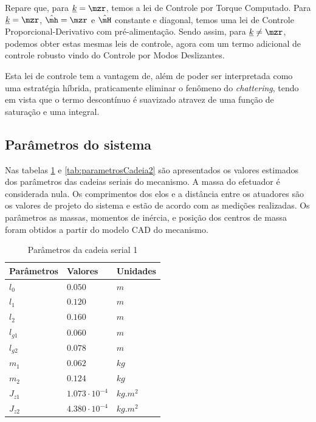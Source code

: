 \documentclass[]{politex}
\begin{document}
Repare que, para $\underline{k} = \mzr$, temos a lei de Controle por Torque Computado. Para $\underline{k} = \mzr$, $\hat{\mh} = \mzr$ e $\hat{\mH}$ constante e diagonal, temos uma lei de Controle Proporcional-Derivativo com pré-alimentação. Sendo assim, para $\underline{k} \neq \mzr$, podemos obter estas mesmas leis de controle, agora com um termo adicional de controle robusto vindo do Controle por Modos Deslizantes.

Esta lei de controle tem a vantagem de, além de poder ser interpretada como uma estratégia híbrida, praticamente eliminar o fenômeno do \emph{chattering}, tendo em vista que o termo descontínuo é suavizado atravez de uma função de saturação e uma integral.

\subsection{Parâmetros do sistema}

Nas tabelas \ref{tab:parametrosCadeia1} e \ref{tab:parametrosCadeia2} são apresentados os valores estimados dos parâmetros das cadeias seriais do mecanismo. A massa do efetuador é considerada nula. Os comprimentos dos elos e a distância entre os atuadores são os valores de projeto do sistema e estão de acordo com as medições realizadas. Os parâmetros as massas, momentos de inércia, e posição dos centros de massa foram obtidos a partir do modelo CAD do mecanismo. 

\begin{table}[H] 
\centering
\caption{Parâmetros da cadeia serial 1}
\label{tab:parametrosCadeia1}
\begin{tabular}{l|l|l}
Parâmetros   & Valores                  & Unidades      \\ \hline
$l_0$        & $0.050$                     & $m$        \\
$l_1$        & $0.120$                     & $m$        \\
$l_2$        & $0.160$                     & $m$        \\
$l_{g1}$     & $0.060$                     & $m$        \\
$l_{g2}$     & $0.078$                    & $m$        \\
$m_1$        & $0.062$                    & $kg$       \\
$m_2$        & $0.124$                    & $kg$       \\
$J_{z1}$     & $1.073 \cdot 10^{-4}$    & $kg.m^{2}$ \\
$J_{z2}$     & $4.380 \cdot 10^{-4}$    & $kg.m^{2}$ \\
\end{tabular}
\end{table} 
\end{document}

